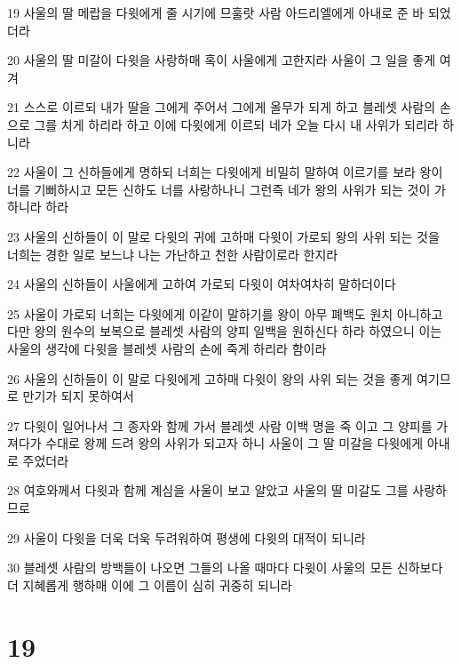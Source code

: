 \par 19 사울의 딸 메랍을 다윗에게 줄 시기에 므훌랏 사람 아드리엘에게 아내로 준 바 되었더라
\par 20 사울의 딸 미갈이 다윗을 사랑하매 혹이 사울에게 고한지라 사울이 그 일을 좋게 여겨
\par 21 스스로 이르되 내가 딸을 그에게 주어서 그에게 올무가 되게 하고 블레셋 사람의 손으로 그를 치게 하리라 하고 이에 다윗에게 이르되 네가 오늘 다시 내 사위가 되리라 하니라
\par 22 사울이 그 신하들에게 명하되 너희는 다윗에게 비밀히 말하여 이르기를 보라 왕이 너를 기뻐하시고 모든 신하도 너를 사랑하나니 그런즉 네가 왕의 사위가 되는 것이 가하니라 하라
\par 23 사울의 신하들이 이 말로 다윗의 귀에 고하매 다윗이 가로되 왕의 사위 되는 것을 너희는 경한 일로 보느냐 나는 가난하고 천한 사람이로라 한지라
\par 24 사울의 신하들이 사울에게 고하여 가로되 다윗이 여차여차히 말하더이다
\par 25 사울이 가로되 너희는 다윗에게 이같이 말하기를 왕이 아무 폐백도 원치 아니하고 다만 왕의 원수의 보복으로 블레셋 사람의 양피 일백을 원하신다 하라 하였으니 이는 사울의 생각에 다윗을 블레셋 사람의 손에 죽게 하리라 함이라
\par 26 사울의 신하들이 이 말로 다윗에게 고하매 다윗이 왕의 사위 되는 것을 좋게 여기므로 만기가 되지 못하여서
\par 27 다윗이 일어나서 그 종자와 함께 가서 블레셋 사람 이백 명을 죽 이고 그 양피를 가져다가 수대로 왕께 드려 왕의 사위가 되고자 하니 사울이 그 딸 미갈을 다윗에게 아내로 주었더라
\par 28 여호와께서 다윗과 함께 계심을 사울이 보고 알았고 사울의 딸 미갈도 그를 사랑하므로
\par 29 사울이 다윗을 더욱 더욱 두려워하여 평생에 다윗의 대적이 되니라
\par 30 블레셋 사람의 방백들이 나오면 그들의 나올 때마다 다윗이 사울의 모든 신하보다 더 지혜롭게 행하매 이에 그 이름이 심히 귀중히 되니라

\chapter{19}

